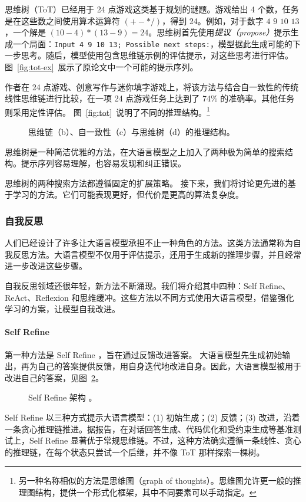 思维树（ToT）已经用于 24 点游戏这类基于规划的谜题。游戏给出 4 个数，任务是在这些数之间使用算术运算符 $( + - * / )$，得到 24。例如，对于数字 $4$ $9$ $10$ $13$，一个解是 $(10-4)*(13-9)=24$。思维树首先使用{\em 提议（propose）}提示生成一个局面：\verb|Input 4 9 10 13; Possible next steps:|，模型据此生成可能的下一步思考。随后，模型使用包含思维链示例的评估提示，对这些思考进行评估。图~\ref{fig:tot-ex}~展示了原论文中一个可能的提示序列。

作者在 24 点游戏、创意写作与迷你填字游戏上，将该方法与结合自一致性的传统线性思维链进行比较，在一项 24 点游戏任务上达到了 74\% 的准确率。其他任务则采用定性评估。
图~\ref{fig:tot}~说明了不同的推理结构。\footnote{另一种名称相似的方法是思维图（graph of thoughts）\citep{besta2024graph}。思维图允许更一般的推理图结构，提供一个形式化框架，其中不同要素可以手动指定。}

\begin{figure}
  \begin{center}
    
    \caption{思维链（b）、自一致性（c）与思维树（d）的推理结构。} \label{fig:tot} \label{fig:bot}
  \end{center}
\end{figure}

思维树是一种简洁优雅的方法，在大语言模型之上加入了两种极为简单的搜索结构。提示序列容易理解，也容易发现和纠正错误。

思维树的两种搜索方法都遵循固定的扩展策略。
接下来，我们将讨论更先进的基于学习的方法。它们可能表现更好，但代价是更高的算法复杂度。

\subsubsection{自我反思}\label{sec:reflective}\label{sec:selfreflection}
人们已经设计了许多让大语言模型承担不止一种角色的方法。这类方法通常称为自我反思方法。大语言模型不仅用于评估提示，还用于生成新的推理步骤，并且经常进一步改进这些步骤。

自我反思领域还很年轻，新方法不断涌现。我们将介绍其中四种：Self Refine、ReAct、Reflexion 和思维缓冲。这些方法以不同方式使用大语言模型，借鉴强化学习的方案，让模型自我改进。

\paragraph{Self Refine} 第一种方法是 Self Refine \citep{madaan2023self}，旨在通过反馈改进答案。
大语言模型先生成初始输出，再为自己的答案提供反馈，用自身迭代地改进自身。因此，大语言模型被用于改进自己的答案，见图~\ref{fig:refine}。
 \begin{figure}
   \begin{center}
     
     \caption{Self Refine 架构 \citep{madaan2023self}。}\label{fig:refine}
  \end{center}
\end{figure}
Self Refine 以三种方式提示大语言模型：(1) 初始生成；(2) 反馈；(3) 改进，沿着一条贪心推理链推进。据报告，在对话回答生成、代码优化和受约束生成等基准测试上，Self Refine 显著优于常规思维链。不过，这种方法确实遵循一条线性、贪心的推理链，在每个状态只尝试一个后继，并不像 ToT 那样探索一棵树。

